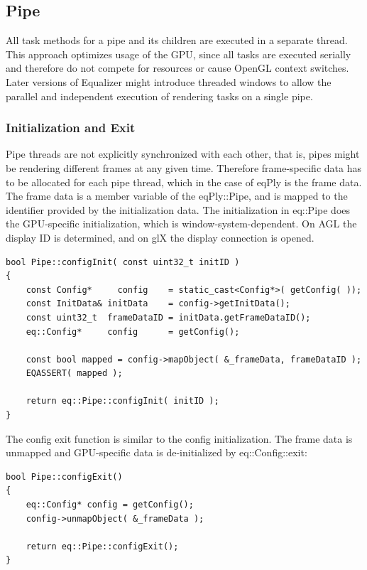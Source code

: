 \documentclass[10pt,a4]{scrartcl}
\begin{document}
\subsection{Pipe}

All task methods for a pipe and its children are executed in a separate
thread. This approach optimizes usage of the GPU, since all
tasks are executed serially and therefore do not compete for resources
or cause OpenGL context switches. Later versions of Equalizer might
introduce threaded windows to allow the parallel and independent
execution of rendering tasks on a single pipe.

\subsubsection{Initialization and Exit}

Pipe threads are not explicitly synchronized with each other, that is,
pipes might be rendering different frames at any given time. Therefore
frame-specific data has to be allocated for each pipe thread, which in
the case of \textsf{eqPly} is the frame data. The frame data is a member
variable of the \textsf{eqPly::Pipe}, and is mapped to the identifier
provided by the initialization data. The initialization in
\textsf{eq::Pipe} does the GPU-specific initialization, which is
window-system-dependent. On AGL the display ID is determined, and on glX
the display connection is opened.

{\footnotesize\begin{lstlisting}
bool Pipe::configInit( const uint32_t initID )
{
    const Config*     config    = static_cast<Config*>( getConfig( ));
    const InitData& initData    = config->getInitData();
    const uint32_t  frameDataID = initData.getFrameDataID();
    eq::Config*     config      = getConfig();

    const bool mapped = config->mapObject( &_frameData, frameDataID );
    EQASSERT( mapped );

    return eq::Pipe::configInit( initID );
}
\end{lstlisting}}

The config exit function is similar to the config initialization. The
frame data is unmapped and GPU-specific data is de-initialized by
\textsf{eq::Config::exit}:

{\footnotesize\begin{lstlisting}
bool Pipe::configExit()
{
    eq::Config* config = getConfig();
    config->unmapObject( &_frameData );

    return eq::Pipe::configExit();
}
\end{lstlisting}}
\end{document}
